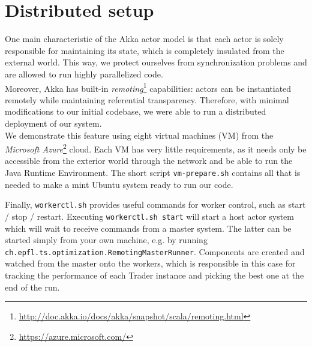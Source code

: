 
\section{Distributed setup}

One main characteristic of the Akka actor model is that each actor is solely responsible for maintaining its state, which is completely insulated from the external world. This way, we protect ourselves from synchronization problems and are allowed to run highly parallelized code.\\
Moreover, Akka has built-in \textit{remoting}\footnote{\url{http://doc.akka.io/docs/akka/snapshot/scala/remoting.html}} capabilities: actors can be instantiated remotely while maintaining referential transparency. Therefore, with minimal modifications to our initial codebase, we were able to run a distributed deployment of our system.\\

We demonstrate this feature using eight virtual machines (VM) from the \textit{Microsoft Azure}\footnote{\url{https://azure.microsoft.com/}} cloud. Each VM has very little requirements, as it needs only be accessible from the exterior world through the network and be able to run the Java Runtime Environment. The short script \texttt{vm-prepare.sh} contains all that is needed to make a mint Ubuntu system ready to run our code.

Finally, \texttt{workerctl.sh} provides useful commands for worker control, such as start / stop / restart. Executing \texttt{workerctl.sh start} will start a host actor system which will wait to receive commands from a master system. The latter can be started simply from your own machine, e.g. by running \texttt{ch.epfl.ts.optimization.RemotingMasterRunner}. Components are created and watched from the master onto the workers, which is responsible in this case for tracking the performance of each Trader instance and picking the best one at the end of the run.
